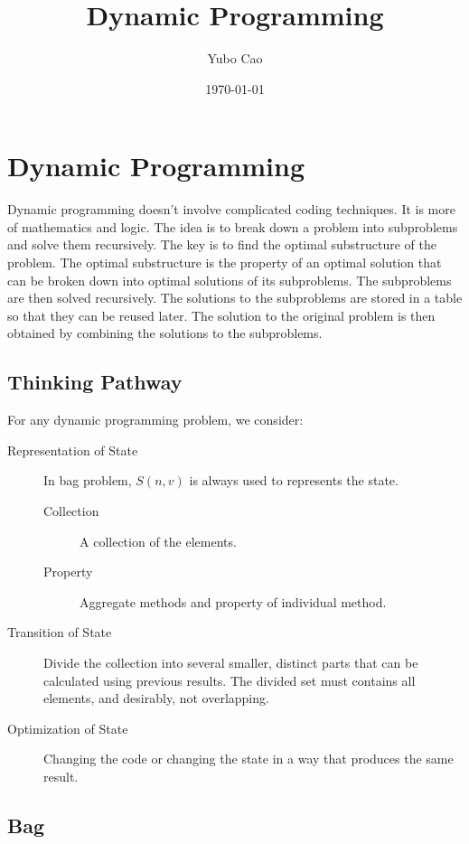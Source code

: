 \documentclass{article}
\title{Dynamic Programming}
\author{Yubo Cao}
\date{\today}
\begin{document}
\maketitle
\tableofcontents
\newpage

\section{Dynamic Programming}

Dynamic programming doesn't involve complicated coding techniques. It is more of mathematics and logic. The idea is to break down a problem into subproblems and solve them recursively. The key is to find the optimal substructure of the problem. The optimal substructure is the property of an optimal solution that can be broken down into optimal solutions of its subproblems. The subproblems are then solved recursively. The solutions to the subproblems are stored in a table so that they can be reused later. The solution to the original problem is then obtained by combining the solutions to the subproblems.

\subsection{Thinking Pathway}

For any dynamic programming problem, we consider:

\begin{description}
	\item[Representation of State] In bag problem, $S(n, v)$ is always used to represents the state.
		\begin{description}
			\item[Collection] A collection of the elements.
			\item[Property] Aggregate methods and property of individual method.
		\end{description}
	\item[Transition of State] Divide the collection into several smaller, distinct parts that can be calculated using previous results. The divided set must contains all elements, and desirably, not overlapping.
	\item[Optimization of State] Changing the code or changing the state in a way that produces the same result.
\end{description}

\subsection{Bag}
\end{document}
